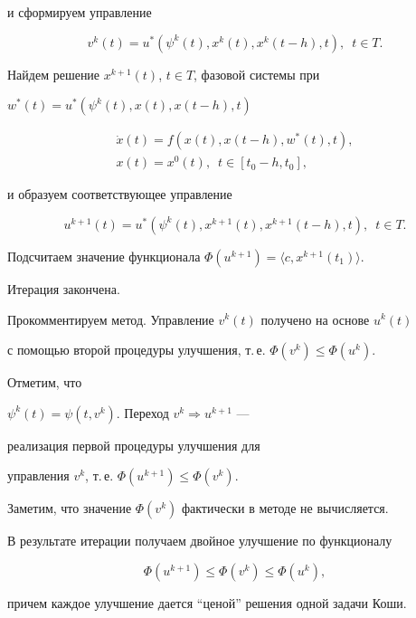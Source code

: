 и сформируем управление


$$


v^k(t)=u^*(\psi^k(t),x^k(t),x^k(t-h),t),\ \;t\in T.


$$


Найдем решение $x^{k+1}(t)$, $t\in T$, фазовой системы при


$w^*(t)=u^*(\psi^k(t),x(t),x(t-h),t)$


\begin{gather*}


\Dot{x}(t) = f(x(t),x(t-h),w^*(t),t), \\


x(t)=x^0(t),\ \;t\in [t_0-h,t_0],




\end{gather*}


и образуем соответствующее управление


$$


u^{k+1}(t)=u^*(\psi^k(t),x^{k+1}(t),x^{k+1}(t-h),t),\ \;t\in T.


$$


Подсчитаем значение функционала $\Phi(u^{k+1})=\langle c,x^{k+1}(t_1)\rangle$.


Итерация закончена.





Прокомментируем метод. Управление $v^k(t)$ получено на основе $u^k(t)$


с помощью второй процедуры улучшения, т.\,е. $\Phi(v^k)\leq\Phi(u^k)$.


Отметим, что


$\psi^k(t)=\psi(t,v^k)$. Переход $v^k\Rightarrow u^{k+1}$ ---


реализация первой процедуры улучшения для 


управления $v^k$, т.\,е. $\Phi(u^{k+1})\leq\Phi(v^k)$.


Заметим, что значение $\Phi(v^k)$ фактически в методе не вычисляется.





В результате итерации получаем двойное улучшение по функционалу


$$


\Phi(u^{k+1})\leq\Phi(v^k)\leq\Phi(u^k),


$$


причем каждое улучшение дается ``ценой'' решения одной задачи Коши.





